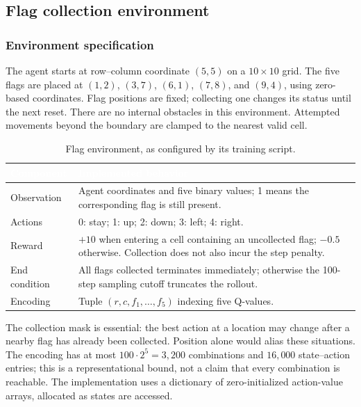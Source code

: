 \documentclass[11pt,a4paper]{article}
\theoremstyle{definition}
\theoremstyle{plain}
\theoremstyle{remark}
\newcommand{\thcell}[1]{\textcolor{white}{\textbf{#1}}}
\begin{document}
\subsection{Flag collection environment}
\label{sec:flag}

\subsubsection{Environment specification}

The agent starts at row--column coordinate $(5,5)$ on a $10\times10$ grid. The five flags are placed at $(1,2)$, $(3,7)$, $(6,1)$, $(7,8)$, and $(9,4)$, using zero-based coordinates. Flag positions are fixed; collecting one changes its status until the next reset. There are no internal obstacles in this environment. Attempted movements beyond the boundary are clamped to the nearest valid cell.

\begin{table}[h!]
\centering\small
\begin{tabularx}{\linewidth}{@{}p{3.0cm}Y@{}}
\toprule
{}\thcell{Component}&\thcell{Implemented behavior}\\
\midrule
Observation & Agent coordinates and five binary values; 1 means the corresponding flag is still present.\\
 Actions & 0: stay; 1: up; 2: down; 3: left; 4: right.\\
Reward & $+10$ when entering a cell containing an uncollected flag; $-0.5$ otherwise. Collection does not also incur the step penalty.\\
 End condition & All flags collected terminates immediately; otherwise the 100-step sampling cutoff truncates the rollout.\\
Encoding & Tuple $(r,c,f_1,\ldots,f_5)$ indexing five Q-values.\\
\bottomrule
\end{tabularx}
\caption{Flag environment, as configured by its training script.}
\label{tab:flag-env}
\end{table}

The collection mask is essential: the best action at a location may change after a nearby flag has already been collected. Position alone would alias these situations. The encoding has at most $100\cdot2^5=3{,}200$ combinations and $16{,}000$ state--action entries; this is a representational bound, not a claim that every combination is reachable. The implementation uses a dictionary of zero-initialized action-value arrays, allocated as states are accessed.
\end{document}
